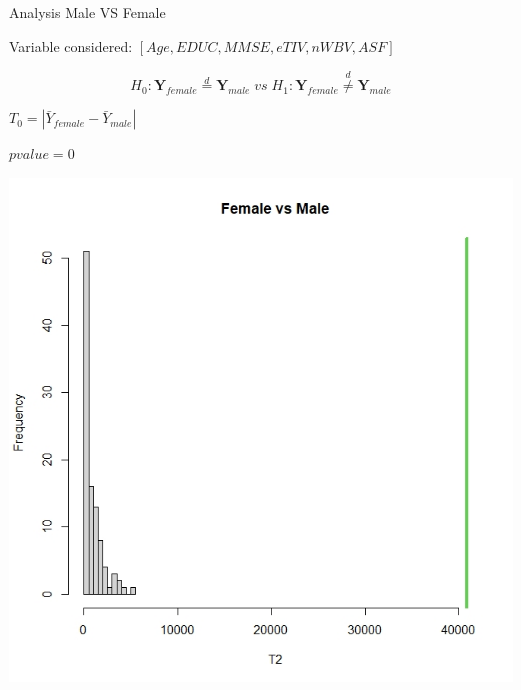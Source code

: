 \documentclass{beamer}
\begin{document}
	\begin{frame}{Analysis Male VS Female}
		\vspace{0.1cm}
	
	\begin{small}	Variable considered: $[Age,EDUC,MMSE,eTIV,nWBV,ASF]$ \end{small}
		\vspace{-0.2cm}
		
	$$
	H_0: \mathbf{Y}_{female} \overset{d}{=} \mathbf{Y}_{male}\;vs\;H_1:\mathbf{Y}_{female} \overset{d}{\neq} \mathbf{Y}_{male}
	$$
	 
	
	\begin{multicols}{2}
		
	\vspace{0.5cm}
	$T_0 = |\bar{Y}_{female} - \bar{Y}_{male}|$	
	
	\vspace{1cm}
	$pvalue= 0 $
	\columnbreak

	\begin{center}
		\includegraphics[width=0.95\columnwidth]{histmvsf.jpeg}
	\end{center}
	\end{multicols}

	
	\end{frame}
\end{document}
